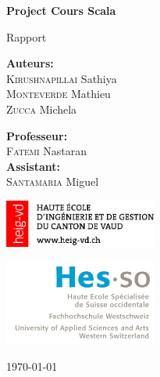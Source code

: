 \begin{titlepage}
    \begin{center}

	 \vspace{0.5cm}
     {\fontsize{1.5cm}{1.8cm} \bf Project Cours Scala}\par
     \vspace{0.5cm}
     {\fontsize{0.9cm}{1.3cm} \selectfont Rapport}\par
     \vspace{3cm}
     \vfill
        
        \begin{minipage}{0.4\textwidth}
        	\begin{flushleft} \large
        		\textbf{Auteurs:}\\
        		\textsc{Kirushnapillai} Sathiya \\
        		\textsc{Monteverde} Mathieu \\
        		\textsc{Zucca} Michela
        	\end{flushleft}
        \end{minipage}
        \begin{minipage}{0.4\textwidth}
            \begin{flushright} \large
                \textbf{Professeur:} \\
                \textsc{Fatemi} Nastaran \\
                \textbf{Assistant:} \\
                \textsc{Santamaria} Miguel  
            \end{flushright}
        \end{minipage}
    
        \vfill
    \begin{minipage}{0.4\textwidth}
    	\begin{flushleft} \large
       		\includegraphics[width=5cm]{images/logo_heig.png}
        \end{flushleft}

	\end{minipage}
	\begin{minipage}{0.4\textwidth}
	    \begin{flushright}
			\includegraphics[width=5cm]{images/logo-hes-so.jpg}
		\end{flushright}
	\end{minipage}


        \today
        
    \end{center}
\end{titlepage}
